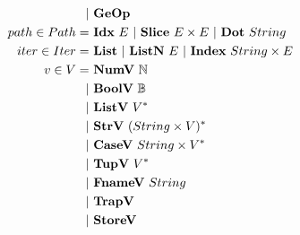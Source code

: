 \begin{align*}
    | & ~ \geop \\
%
  path \in Path =& ~ \idxp ~ E ~ | ~ \slicep ~ E \times E ~ | ~ \dotp ~ String \\
%
  iter \in Iter =& ~ \listiter ~ | ~ \listniter ~ E ~|~ \listidxiter ~ String \times E \\
%
  v \in V =& ~ \numv ~ \mathbb N \\
    | & ~ \boolv ~ \mathbb B \\
    | & ~ \listv ~ \seq V \\
    | & ~ \strv ~ \seq{(String \times V)} \\
    | & ~ \casev ~ String \times \seq V \\
    | & ~ \tupv ~ \seq V \\
    | & ~ \fnamev ~ String \\
    | & ~ \trapv \\
    | & ~ \storev \\
\end{align*}





\newpage

